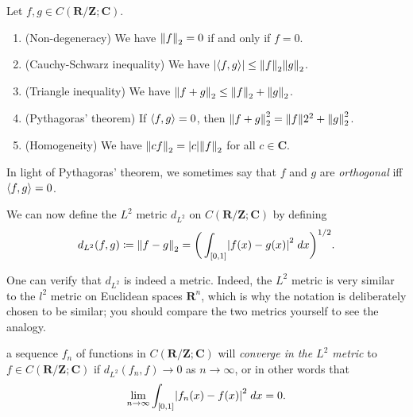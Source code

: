 \setcounter{theorem}{6}
\begin{lemma}\label{5.2.7}
    Let \(f, g \in C(\mathbf{R} / \mathbf{Z} ; \mathbf{C})\).
    \begin{enumerate}
        \item (Non-degeneracy)
              We have \(\norm*{f}_2 = 0\) if and only if \(f = 0\).
        \item (Cauchy-Schwarz inequality)
              We have \(\abs*{\inner*{f, g}} \leq \norm*{f}_2 \norm*{g}_2\).
        \item (Triangle inequality)
              We have \(\norm*{f + g}_2 \leq \norm*{f}_2 + \norm*{g}_2\).
        \item (Pythagoras’ theorem)
              If \(\inner*{f, g} = 0\), then \(\norm*{f + g}_2^2 = \norm*{f}2^2 + \norm*{g}_2^2\).
        \item (Homogeneity)
              We have \(\norm*{cf}_2 = \abs*{c} \norm*{f}_2\) for all \(c \in \mathbf{C}\).
    \end{enumerate}
\end{lemma}

\begin{note}
    In light of Pythagoras' theorem, we sometimes say that \(f\) and \(g\) are \emph{orthogonal} iff \(\inner*{f, g} = 0\).
\end{note}

\begin{note}
    We can now define the \(L^2\) metric \(d_{L^2}\) on \(C(\mathbf{R} / \mathbf{Z} ; \mathbf{C})\) by defining
    \[
        d_{L^2}(f, g) \coloneqq \norm*{f - g}_2 = \bigg(\int_{[0, 1]} \abs*{f(x) - g(x)}^2 \; dx\bigg)^{1 / 2}.
    \]
\end{note}

\begin{remark}\label{5.2.8}
    One can verify that \(d_{L^2}\) is indeed a metric.
    Indeed, the \(L^2\) metric is very similar to the \(l^2\) metric on Euclidean spaces \(\mathbf{R}^n\), which is why the notation is deliberately chosen to be similar;
    you should compare the two metrics yourself to see the analogy.
\end{remark}

\begin{note}
    a sequence \(f_n\) of functions in \(C(\mathbf{R} / \mathbf{Z} ; \mathbf{C})\) will \emph{converge in the \(L^2\) metric} to \(f \in C(\mathbf{R} / \mathbf{Z} ; \mathbf{C})\) if \(d_{L^2}(f_n, f) \to 0\) as \(n \to \infty\), or in other words that
    \[
        \lim_{n \to \infty} \int_{[0, 1]} \abs*{f_n(x) - f(x)}^2 \; dx = 0.
    \]
\end{note}

